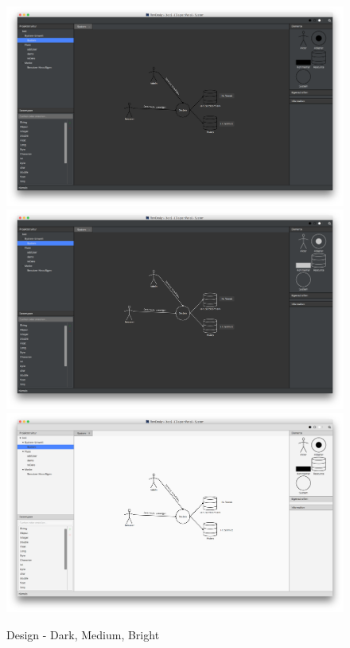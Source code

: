 \begin{figure}[h!]
	\centering
	\includegraphics[width=.45\textwidth]{Design_Dark.png}
	\includegraphics[width=.45\textwidth]{Design_Medium.png}
	\includegraphics[width=.45\textwidth]{Design_Bright.png}
	\caption{Design - Dark, Medium, Bright}
\end{figure}